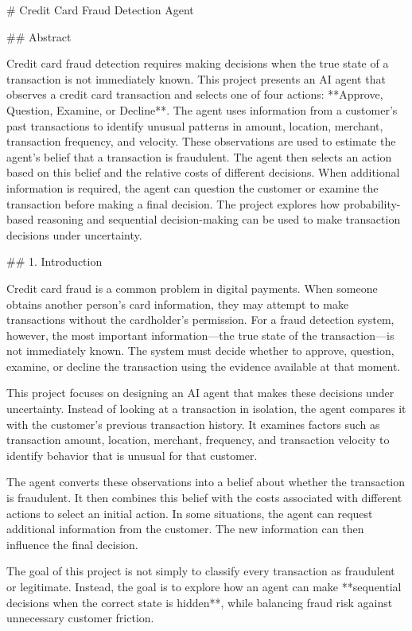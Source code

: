 # Credit Card Fraud Detection Agent

## Abstract

Credit card fraud detection requires making decisions when the true state of a transaction is not immediately known. This project presents an AI agent that observes a credit card transaction and selects one of four actions: **Approve, Question, Examine, or Decline**. The agent uses information from a customer's past transactions to identify unusual patterns in amount, location, merchant, transaction frequency, and velocity. These observations are used to estimate the agent's belief that a transaction is fraudulent. The agent then selects an action based on this belief and the relative costs of different decisions. When additional information is required, the agent can question the customer or examine the transaction before making a final decision. The project explores how probability-based reasoning and sequential decision-making can be used to make transaction decisions under uncertainty.

## 1. Introduction

Credit card fraud is a common problem in digital payments. When someone obtains another person's card information, they may attempt to make transactions without the cardholder's permission. For a fraud detection system, however, the most important information—the true state of the transaction—is not immediately known. The system must decide whether to approve, question, examine, or decline the transaction using the evidence available at that moment.

This project focuses on designing an AI agent that makes these decisions under uncertainty. Instead of looking at a transaction in isolation, the agent compares it with the customer's previous transaction history. It examines factors such as transaction amount, location, merchant, frequency, and transaction velocity to identify behavior that is unusual for that customer.

The agent converts these observations into a belief about whether the transaction is fraudulent. It then combines this belief with the costs associated with different actions to select an initial action. In some situations, the agent can request additional information from the customer. The new information can then influence the final decision.

The goal of this project is not simply to classify every transaction as fraudulent or legitimate. Instead, the goal is to explore how an agent can make **sequential decisions when the correct state is hidden**, while balancing fraud risk against unnecessary customer friction.

